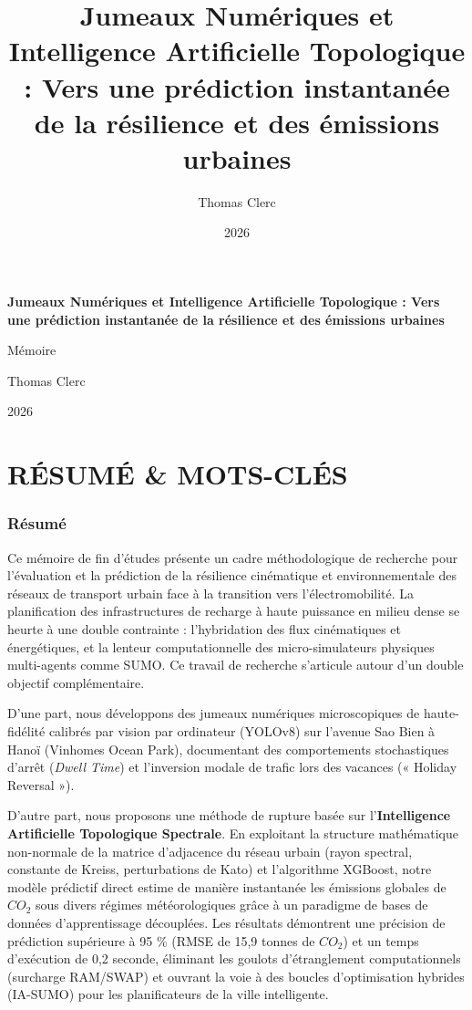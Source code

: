 \documentclass[10pt, a4paper]{article}
\title{Jumeaux Numériques et Intelligence Artificielle Topologique :
Vers une prédiction instantanée de la résilience et des émissions
urbaines}
\author{Thomas Clerc}
\date{2026}
\begin{document}
\begin{titlepage}
\centering
\vspace*{2cm}
{\Huge\bfseries Jumeaux Numériques et Intelligence Artificielle
Topologique : Vers une prédiction instantanée de la résilience et des
émissions urbaines\par}
\vspace{1.5cm}
{\Large Mémoire\par}
\vspace{1cm}
{\large Thomas Clerc\par}
\vspace{0.5cm}
{\large 2026\par}
\vfill
\end{titlepage}

\tableofcontents
\newpage

\section{RÉSUMÉ \& MOTS-CLÉS}\label{ruxe9sumuxe9-mots-cluxe9s}

\subsubsection{Résumé}\label{ruxe9sumuxe9}

Ce mémoire de fin d'études présente un cadre méthodologique de recherche
pour l'évaluation et la prédiction de la résilience cinématique et
environnementale des réseaux de transport urbain face à la transition
vers l'électromobilité. La planification des infrastructures de recharge
à haute puissance en milieu dense se heurte à une double contrainte :
l'hybridation des flux cinématiques et énergétiques, et la lenteur
computationnelle des micro-simulateurs physiques multi-agents comme
SUMO. Ce travail de recherche s'articule autour d'un double objectif
complémentaire.

D'une part, nous développons des jumeaux numériques microscopiques de
haute-fidélité calibrés par vision par ordinateur (YOLOv8) sur l'avenue
Sao Bien à Hanoï (Vinhomes Ocean Park), documentant des comportements
stochastiques d'arrêt (\emph{Dwell Time}) et l'inversion modale de
trafic lors des vacances (« Holiday Reversal »).

D'autre part, nous proposons une méthode de rupture basée sur
l'\textbf{Intelligence Artificielle Topologique Spectrale}. En
exploitant la structure mathématique non-normale de la matrice
d'adjacence du réseau urbain (rayon spectral, constante de Kreiss,
perturbations de Kato) et l'algorithme XGBoost, notre modèle prédictif
direct estime de manière instantanée les émissions globales de \(CO_2\)
sous divers régimes météorologiques grâce à un paradigme de bases de
données d'apprentissage découplées. Les résultats démontrent une
précision de prédiction supérieure à 95 \% (RMSE de 15,9 tonnes de
\(CO_2\)) et un temps d'exécution de 0,2 seconde, éliminant les goulots
d'étranglement computationnels (surcharge RAM/SWAP) et ouvrant la voie à
des boucles d'optimisation hybrides (IA-SUMO) pour les planificateurs de
la ville intelligente.
\end{document}

